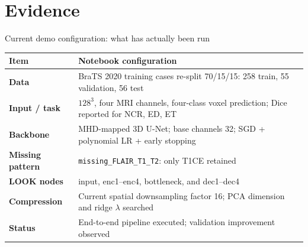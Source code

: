 \documentclass[aspectratio=169,11pt]{beamer}
\begin{document}
\section{Evidence}

\begin{frame}{Current demo configuration: what has actually been run}
  \small
  \begin{tabularx}{\textwidth}{>{\bfseries\color{LookNavy}}p{3.0cm} Y}
    \toprule
    Item & Notebook configuration \\
    \midrule
    Data & BraTS 2020 training cases re-split 70/15/15: 258 train, 55 validation, 56 test \\
    Input / task & $128^3$, four MRI channels, four-class voxel prediction; Dice reported for NCR, ED, ET \\
    Backbone & MHD-mapped 3D U-Net; base channels 32; SGD + polynomial LR + early stopping \\
    Missing pattern & \texttt{missing\_FLAIR\_T1\_T2}: only T1CE retained \\
    LOOK nodes & input, enc1--enc4, bottleneck, and dec1--dec4 \\
    Compression & Current spatial downsampling factor 16; PCA dimension and ridge $\lambda$ searched \\
    Status & End-to-end pipeline executed; validation improvement observed \\
    \bottomrule
  \end{tabularx}
\end{frame}
\end{document}
